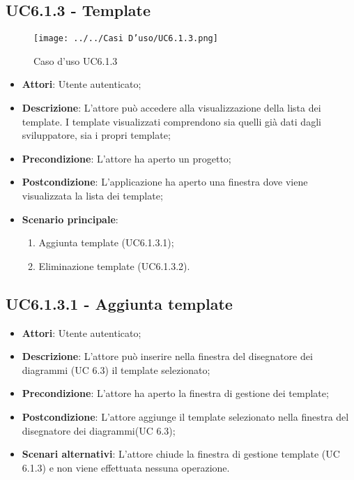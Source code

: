 \subsection{UC6.1.3 - Template} 
\label{ssec:UC6.1.3} 
\begin{figure}[h!] 
\centering 
\texttt{[image: ../../Casi D'uso/UC6.1.3.png]} 
\caption{Caso d'uso UC6.1.3} 
 \end{figure} 
\begin{itemize} 
\item \textbf{Attori}: Utente autenticato;
\item \textbf{Descrizione}: L’attore può accedere alla visualizzazione della lista dei template. I template visualizzati comprendono sia quelli già dati dagli sviluppatore, sia i propri template;
\item \textbf{Precondizione}: L’attore ha aperto un progetto;
\item \textbf{Postcondizione}: L'applicazione ha aperto una finestra dove viene visualizzata la lista dei template;
\item \textbf{Scenario principale}: \begin{enumerate}\item Aggiunta template (UC6.1.3.1);\item Eliminazione template (UC6.1.3.2). 
 \end{enumerate}
\end{itemize} 
\subsection{UC6.1.3.1 - Aggiunta template} 
\label{ssec:UC6.1.3.1} 
\begin{itemize} 
\item \textbf{Attori}: Utente autenticato;
\item \textbf{Descrizione}: L'attore può inserire nella finestra del disegnatore dei diagrammi (UC 6.3) il template selezionato;
\item \textbf{Precondizione}: L'attore ha aperto la finestra di gestione dei template;
\item \textbf{Postcondizione}: L'attore aggiunge il template selezionato nella finestra del disegnatore dei diagrammi(UC 6.3);
\item \textbf{Scenari alternativi}: L'attore chiude la finestra di gestione template (UC 6.1.3) e non viene effettuata nessuna operazione.
\end{itemize} 
